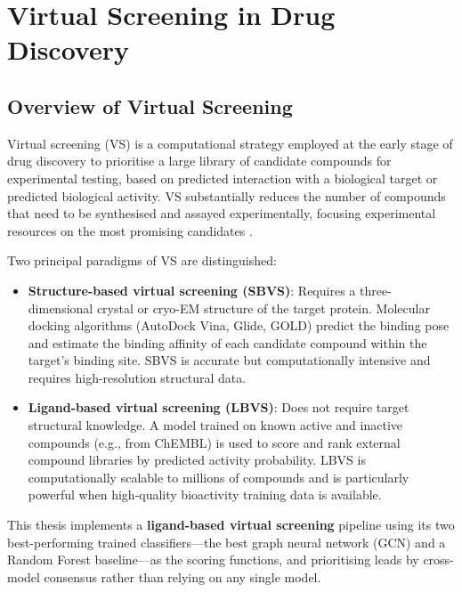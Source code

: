 \section{Virtual Screening in Drug Discovery}
\label{sec:vs_lit}

\subsection{Overview of Virtual Screening}

Virtual screening (VS) is a computational strategy employed at the early stage
of drug discovery to prioritise a large library of candidate compounds for
experimental testing, based on predicted interaction with a biological target
or predicted biological activity. VS substantially reduces the number of compounds
that need to be synthesised and assayed experimentally, focusing experimental
resources on the most promising candidates \parencite{walters2020generative}.

Two principal paradigms of VS are distinguished:
\begin{itemize}
    \item \textbf{Structure-based virtual screening (SBVS)}: Requires a
    three-dimensional crystal or cryo-EM structure of the target protein. Molecular
    docking algorithms (AutoDock Vina, Glide, GOLD) predict the binding pose and
    estimate the binding affinity of each candidate compound within the target's
    binding site. SBVS is accurate but computationally intensive and requires
    high-resolution structural data.
    \item \textbf{Ligand-based virtual screening (LBVS)}: Does not require target
    structural knowledge. A model trained on known active and inactive compounds
    (e.g., from ChEMBL) is used to score and rank external compound libraries by
    predicted activity probability. LBVS is computationally scalable to millions
    of compounds and is particularly powerful when high-quality bioactivity training
    data is available.
\end{itemize}

This thesis implements a \textbf{ligand-based virtual screening} pipeline using its
two best-performing trained classifiers---the best graph neural network (GCN) and a
Random Forest baseline---as the scoring functions, and prioritising leads by
cross-model consensus rather than relying on any single model.

